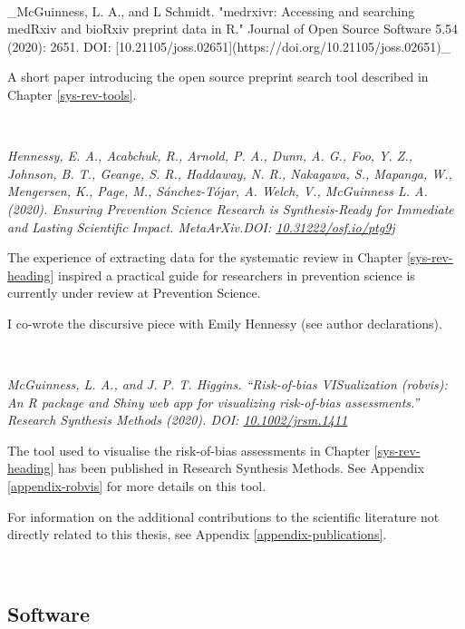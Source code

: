 \documentclass[a4paper,nobind]{templates/ociamthesis}
\begin{document}
~

\usepackage{hanging}
\begin{hangparas}{.25in}{1}

_McGuinness, L. A., and L Schmidt. "medrxivr: Accessing and searching medRxiv and bioRxiv preprint data in R." Journal of Open Source Software 5.54 (2020): 2651. DOI: [10.21105/joss.02651](https://doi.org/10.21105/joss.02651)_
\end{hangparas}

A short paper introducing the open source preprint search tool described in Chapter \ref{sys-rev-tools}.

~

\emph{Hennessy, E. A., Acabchuk, R., Arnold, P. A., Dunn, A. G., Foo, Y. Z., Johnson, B. T., Geange, S. R., Haddaway, N. R., Nakagawa, S., Mapanga, W., Mengersen, K., Page, M., Sánchez-Tójar, A. Welch, V., McGuinness L. A. (2020). Ensuring Prevention Science Research is Synthesis-Ready for Immediate and Lasting Scientific Impact. MetaArXiv.DOI: \href{https://doi.org/10.31222/osf.io/ptg9j}{10.31222/osf.io/ptg9j}}

The experience of extracting data for the systematic review in Chapter \ref{sys-rev-heading} inspired a practical guide for researchers in prevention science is currently under review at Prevention Science.

I co-wrote the discursive piece with Emily Hennessy (see author declarations).

~

\emph{McGuinness, L. A., and J. P. T. Higgins. ``Risk‐of‐bias VISualization (robvis): An R package and Shiny web app for visualizing risk‐of‐bias assessments.'' Research Synthesis Methods (2020). DOI: \href{https://doi.org/10.1002/jrsm.1411}{10.1002/jrsm.1411}}

The tool used to visualise the risk-of-bias assessments in Chapter \ref{sys-rev-heading} has been published in Research Synthesis Methods. See Appendix \ref{appendix-robvis} for more details on this tool.

For information on the additional contributions to the scientific literature not directly related to this thesis, see Appendix \ref{appendix-publications}.

~

\hypertarget{software}{%
\subsection{Software}\label{software}}
\end{document}
